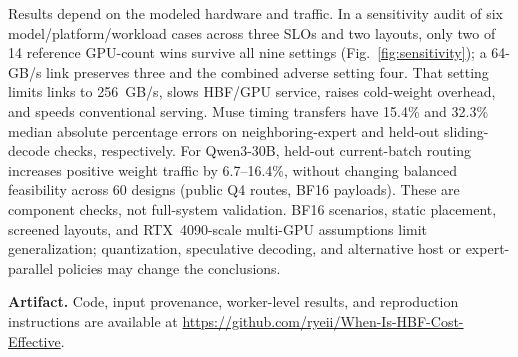 \documentclass[lettersize,journal]{IEEEtran}
\begin{document}
Results depend on the modeled hardware and traffic. In a sensitivity audit of six model/platform/workload cases across three SLOs and two layouts, only two of 14 reference GPU-count wins survive all nine settings (Fig.~\ref{fig:sensitivity}); a 64-GB/s link preserves three and the combined adverse setting four. That setting limits links to 256~GB/s, slows HBF/GPU service, raises cold-weight overhead, and speeds conventional serving. Muse timing transfers have 15.4\% and 32.3\% median absolute percentage errors on neighboring-expert and held-out sliding-decode checks, respectively. For Qwen3-30B, held-out current-batch routing increases positive weight traffic by 6.7--16.4\%, without changing balanced feasibility across 60 designs (public Q4 routes, BF16 payloads). These are component checks, not full-system validation. BF16 scenarios, static placement, screened layouts, and RTX~4090-scale multi-GPU assumptions limit generalization; quantization, speculative decoding, and alternative host or expert-parallel policies may change the conclusions.



\textbf{Artifact.}
Code, input provenance, worker-level results, and reproduction instructions are available at \url{https://github.com/ryeii/When-Is-HBF-Cost-Effective}.


\end{document}
